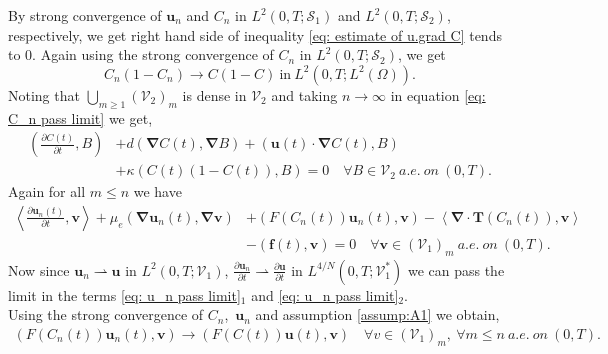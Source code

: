 \documentclass[final,3p,times]{elsarticle}
\theoremstyle{plain}
\theoremstyle{remark}
\theoremstyle{plain}
\theoremstyle{remark}
\begin{document}
By strong convergence of $\mathbf{u}_n$ and $C_n$ in $L^2\left(0,T; \mathscr S_1\right)$ and $L^2\left(0,T; \mathscr S_2\right)$, respectively, we get right hand side of inequality \eqref{eq: estimate of u.grad C} tends to 0. Again using the strong convergence of $C_n$ in $L^2\left(0,T; \mathscr S_2\right)$, we get 
$$C_n\left(1-C_n\right) \to C\left(1-C\right) \ \text{in} \ L^2\left(0,T; L^2(\Omega)\right).$$ 
Noting that $\displaystyle \bigcup_{m \ge 1} \left(\mathscr V_2\right)_m$ is dense in $\mathscr V_2$ and taking $n \to \infty$ in equation \eqref{eq: C_n pass limit} we get,
\begin{align}
	 \left(\frac{\partial C\left(t\right)}{\partial t},B\right)
     & + d\left(\boldsymbol{\nabla} C\left(t\right), \boldsymbol{\nabla} B\right) + \left(\mathbf{u}\left(t\right) \cdot \boldsymbol{\nabla} C\left(t\right),B\right) \nonumber \\ 
     & + \kappa \left(C\left(t\right)\left(1-C\left(t\right)\right),B\right)=0 \quad \forall B \in \mathscr V_2 \ a.e. \ on \ \left(0,T\right). \label{eq: existence of C}
\end{align} 
Again for all $m\le n$ we have 
\begin{align}
	\left \langle  \frac{\partial \mathbf{u}_n\left(t\right)}{\partial t},\mathbf{v} \right \rangle + \mu_e\left(\boldsymbol{\nabla} \mathbf{u}_n\left(t\right), \boldsymbol{\nabla} \mathbf{v}\right)
    & + \left(F\left(C_n\left(t\right)\right) \mathbf{u}_n\left(t\right),\mathbf{v}\right) -\left \langle \boldsymbol{\nabla} \cdot \mathbf{T}\left(C_n\left(t\right)\right) , \mathbf{v} \right \rangle \nonumber \\ 
    & - \left(\mathbf f\left(t\right),\mathbf v\right) = 0 \quad \forall \mathbf{v} \in \left(\mathscr V_1\right)_m \ a.e. \ on \ \left(0,T\right). \label{eq: u_n pass limit}
\end{align}
Now since $\mathbf{u}_n \rightharpoonup \mathbf{u}$ in $L^2\left(0,T;\mathscr V_1\right)$, $ \displaystyle \frac{\partial \mathbf u_n}{\partial t} \rightharpoonup \frac{\partial \mathbf u}{\partial t} $ in $ L^{4/N}\left(0,T;\mathscr V_1^*\right) $ we can pass the limit in the terms \eqref{eq: u_n pass limit}$_1$ and \eqref{eq: u_n pass limit}$_2$. \\Using the strong convergence of $C_n$,\ $\mathbf u_n$ and assumption \eqref{assump:A1} we obtain,
\begin{align}
    \left(F\left(C_n\left(t\right)\right) \mathbf u_n\left(t\right),\mathbf v\right)\to\left(F\left(C\left(t\right)\right)\mathbf u\left(t\right),\mathbf v\right) \quad \forall v \in \left(\mathscr V_1\right)_m, \ \forall m \le n \ a.e.  \ on \ \left(0,T\right) \label{eq: Fu}. 
    \end{align}
\end{document}

